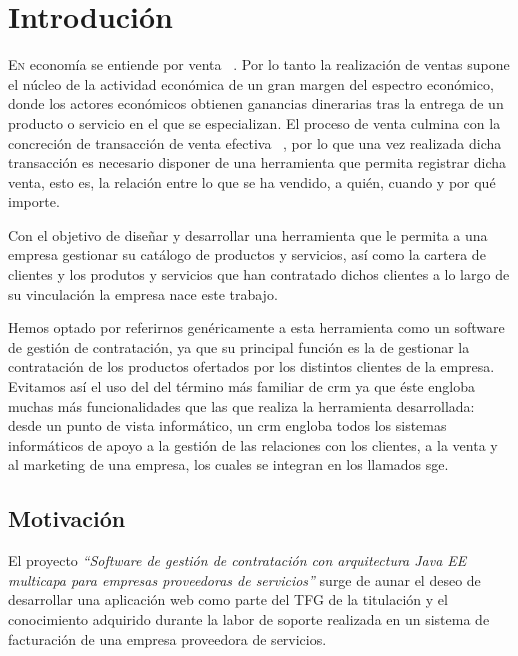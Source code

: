\chapter{Introdución}
\label{chap:introducion}


\lettrine{E}{n} economía se entiende por venta ~\cite{ventas}. Por lo tanto la realización de ventas supone el núcleo de la actividad económica de un gran margen del espectro económico, donde los actores económicos obtienen ganancias dinerarias tras la entrega de un producto o servicio en el que se especializan. El proceso de venta culmina con la concreción de transacción de venta efectiva ~\cite{proceso-venta}, por lo que una vez realizada dicha transacción es necesario disponer de una herramienta que permita registrar dicha venta, esto es, la relación entre lo que se ha vendido, a quién, cuando y por qué importe.

Con el objetivo de diseñar y desarrollar una herramienta que le permita a una empresa gestionar su catálogo de productos y servicios, así como la cartera de clientes y los produtos y servicios que han contratado dichos clientes a lo largo de su vinculación la empresa nace este trabajo.

Hemos optado por referirnos genéricamente a esta herramienta como un software de gestión de contratación, ya que su principal función es la de gestionar la contratación de los productos ofertados por los distintos clientes de la empresa. Evitamos así el uso del del término más familiar de \acrfull{crm} ya que éste engloba muchas más funcionalidades que las que realiza la herramienta desarrollada: desde un punto de vista informático, un \acrshort{crm} engloba todos los sistemas informáticos de apoyo a la gestión de las relaciones con los clientes, a la venta y al marketing de una empresa, los cuales se integran en los llamados \acrfull{sge}.


\section{Motivación}
\label{sec:motivacion}

El proyecto \emph{``Software de gestión de contratación con arquitectura Java EE multicapa para empresas proveedoras de servicios''} surge de aunar el deseo de desarrollar una aplicación web como parte del TFG de la titulación y el conocimiento adquirido durante la labor de soporte realizada en un sistema de facturación de una empresa proveedora de servicios.

